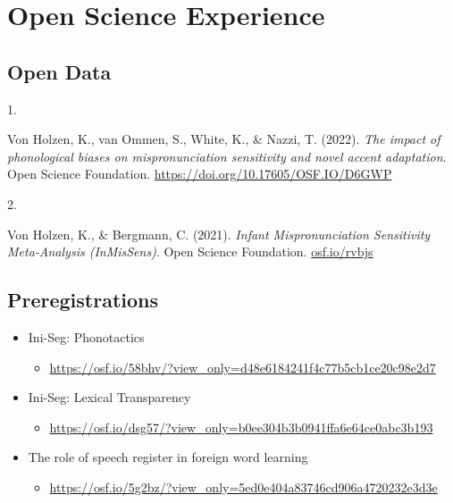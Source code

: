 \documentclass[10pt,a4paper,]{article}
\providecommand{\tightlist}{%
  \setlength{\itemsep}{0pt}\setlength{\parskip}{0pt}}
\newlength{\cslhangindent}
\newlength{\csllabelwidth}
\newcommand{\CSLLeftMargin}[1]{\parbox[t]{\csllabelwidth}{\hfill #1~}}
\newcommand{\CSLRightInline}[1]{\parbox[t]{\linewidth - \cslhangindent - \csllabelwidth}{#1}\vspace{0.8ex}}
\begin{document}
\hypertarget{open-science-experience}{%
\section{Open Science Experience}\label{open-science-experience}}

\hypertarget{open-data}{%
\subsection{Open Data}\label{open-data}}

\hypertarget{bibliography}{}
\leavevmode{}%
\CSLLeftMargin{1. }%
\CSLRightInline{Von Holzen, K., van Ommen, S., White, K., \& Nazzi, T.
(2022). \emph{The impact of phonological biases on mispronunciation
sensitivity and novel accent adaptation}. Open Science Foundation.
\url{https://doi.org/10.17605/OSF.IO/D6GWP}}

\leavevmode{}%
\CSLLeftMargin{2. }%
\CSLRightInline{Von Holzen, K., \& Bergmann, C. (2021). \emph{Infant
Mispronunciation Sensitivity Meta-Analysis (InMisSens)}. Open Science
Foundation. \href{https://osf.io/rvbjs}{osf.io/rvbjs}}

\hypertarget{preregistrations}{%
\subsection{Preregistrations}\label{preregistrations}}

\begin{itemize}
\tightlist
\item
  Ini-Seg: Phonotactics

  \begin{itemize}
  \tightlist
  \item
    \url{https://osf.io/58bhv/?view_only=d48e6184241f4c77b5cb1ce20c98e2d7}
  \end{itemize}
\item
  Ini-Seg: Lexical Transparency

  \begin{itemize}
  \tightlist
  \item
    \url{https://osf.io/dsg57/?view_only=b0ee304b3b0941ffa6e64ce0abc3b193}
  \end{itemize}
\item
  The role of speech register in foreign word learning

  \begin{itemize}
  \tightlist
  \item
    \url{https://osf.io/5g2bz/?view_only=5ed0e404a83746cd906a4720232e3d3e}
  \end{itemize}
\end{itemize}
\end{document}
